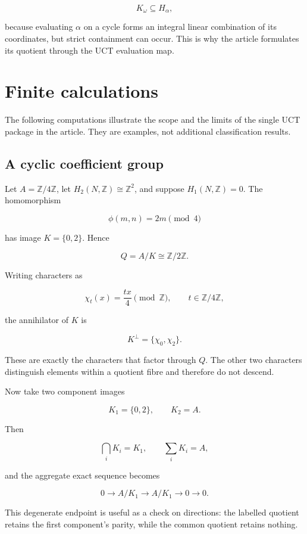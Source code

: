 \[
 K_\omega\subseteq H_\alpha,
\]

because evaluating \(\alpha\) on a cycle forms an integral linear
combination of its coordinates, but strict containment can occur.  This is
why the article formulates its quotient through the UCT evaluation map.

\section{Finite calculations}
\label{sec:finite-calculations}

The following computations illustrate the scope and the limits of the
single UCT package in the article.  They are examples, not additional
classification results.

\subsection{A cyclic coefficient group}

Let \(A=\mathbb Z/4\mathbb Z\), let
\(H_2(N,\mathbb Z)\cong\mathbb Z^2\), and suppose
\(H_1(N,\mathbb Z)=0\).
The homomorphism

\[
 \phi(m,n)=2m\pmod 4
\]

has image \(K=\{0,2\}\).  Hence

\[
 Q=A/K\cong\mathbb Z/2\mathbb Z.
\]

Writing characters as

\[
 \chi_t(x)=\frac{tx}{4}\pmod{\mathbb Z},
 \qquad t\in\mathbb Z/4\mathbb Z,
\]

the annihilator of \(K\) is

\[
 K^\perp=\{\chi_0,\chi_2\}.
\]

These are exactly the characters that factor through \(Q\).  The other two
characters distinguish elements within a quotient fibre and therefore do
not descend.

Now take two component images

\[
 K_1=\{0,2\},\qquad K_2=A.
\]

Then

\[
 \bigcap_iK_i=K_1,
 \qquad
 \sum_iK_i=A,
\]

and the aggregate exact sequence becomes

\[
 0\longrightarrow A/K_1
 \longrightarrow A/K_1
 \longrightarrow 0\longrightarrow0.
\]

This degenerate endpoint is useful as a check on directions: the labelled
quotient retains the first component's parity, while the common quotient
retains nothing.

